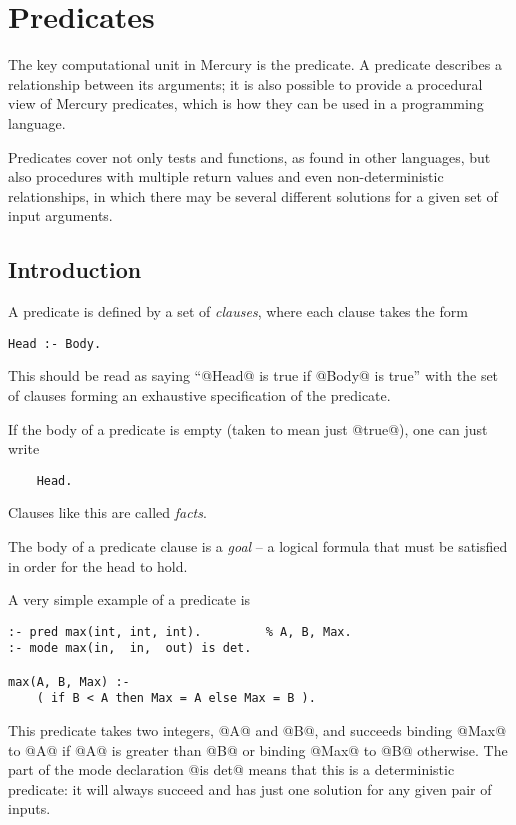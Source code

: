 
\chapter{Predicates}

The key computational unit in Mercury is the predicate.  A
predicate describes a relationship between its arguments; it is
also possible to provide a procedural view of Mercury predicates,
which is how they can be used in a programming language.

Predicates cover not only tests and functions, as found in other
languages, but also procedures with multiple return values and
even non-deterministic relationships, in which there may be
several different solutions for a given set of input arguments.

\section{Introduction}

A predicate is defined by a set of \emph{clauses}, where each
clause takes the form
\begin{verbatim}
Head :- Body.
\end{verbatim}
This should be read as saying ``@Head@ is true if @Body@ is true'' with
the set of clauses forming an exhaustive specification of the
predicate.

If the body of a predicate is empty (taken to mean just @true@), one can
just write
\begin{verbatim}
    Head.
\end{verbatim}
Clauses like this are called \emph{facts}.

The body of a predicate clause is a \emph{goal} -- a logical formula
that must be satisfied in order for the head to hold.

A very simple example of a predicate is
\begin{verbatim}
:- pred max(int, int, int).         % A, B, Max.
:- mode max(in,  in,  out) is det.

max(A, B, Max) :-
    ( if B < A then Max = A else Max = B ).
\end{verbatim}
This predicate takes two integers, @A@ and @B@, and succeeds
binding @Max@ to @A@ if @A@ is greater than @B@ or binding @Max@ to @B@
otherwise.  The part of the mode declaration @is det@ means
that this is a deterministic predicate: it will always succeed
and has just one solution for any given pair of inputs.

